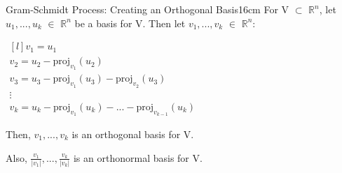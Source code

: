     \newpage



    \begin{wtheorem}{Gram-Schmidt Process: Creating an Orthogonal Basis}{16cm}
        For V $\subset$ $\mathbb{R}^n$, let $u_1,...,u_k$ $\in$ $\mathbb{R}^n$
        be a basis for V. Then let $v_1,...,v_k$ $\in$ $\mathbb{R}^n$:

        \hspace{0.5cm}
        $\begin{matrix*}[l]
            v_1 = u_1 \\
            v_2 = u_2 - \text{proj}_{v_1}(u_2) \\
            v_3 = u_3 - \text{proj}_{v_1}(u_3) - \text{proj}_{v_2}(u_3) \\
            \vdots \\
            v_k = u_k - \text{proj}_{v_1}(u_k) - ... - \text{proj}_{v_{k-1}}(u_k)
        \end{matrix*}$

        Then, $v_1,...,v_k$ is an orthogonal basis for V.

        Also, $\frac{v_1}{|v_1|},...,\frac{v_k}{|v_k|}$ is an orthonormal
        basis for V.
    \end{wtheorem}

